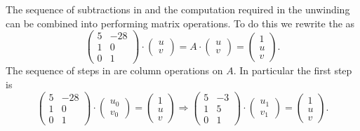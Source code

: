 The sequence of subtractions in  and the
computation required in the unwinding can be combined into performing
matrix operations.  To do this we rewrite the 
as
\[
\begin{pmatrix}5 & -28 \\ 1 & 0 \\ 0 & 1\end{pmatrix} \cdot \begin{pmatrix}u\\ v\end{pmatrix} = 
A \cdot \begin{pmatrix}u\\ v\end{pmatrix} = 
\begin{pmatrix}1\\ u \\ v\end{pmatrix}.
\]
The sequence of steps in  are column operations
on $A$.  In particular the first step is
\[
\begin{pmatrix}5 & -28 \\ 1 & 0 \\ 0 & 1\end{pmatrix} \cdot \begin{pmatrix}u_0\\ v_0\end{pmatrix} = 
\begin{pmatrix}1\\ u \\ v\end{pmatrix}
\Longrightarrow
\begin{pmatrix}5 & -3 \\ 1 & 5 \\ 0 & 1\end{pmatrix} \cdot \begin{pmatrix}u_1\\ v_1\end{pmatrix} = 
\begin{pmatrix}1\\ u \\ v\end{pmatrix}.
\]


